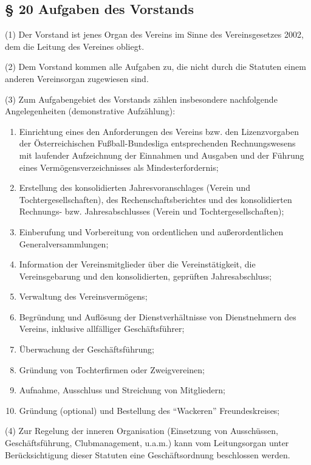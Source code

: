 \documentclass[11pt,a4paper]{article}
\begin{document}
\subsection{§ 20
Aufgaben des Vorstands}

(1)
Der Vorstand ist jenes Organ des Vereins im Sinne des Vereinsgesetzes 2002, dem die Leitung des Vereines obliegt.

(2)
Dem Vorstand kommen alle Aufgaben zu, die nicht durch die Statuten einem anderen Vereinsorgan zugewiesen sind.

(3)
Zum Aufgabengebiet des Vorstands zählen insbesondere nachfolgende Angelegenheiten (demonstrative Aufzählung):

\begin{enumerate}[label=\alph*)]
\item
Einrichtung eines den Anforderungen des Vereins bzw. den Lizenzvorgaben der Österreichischen Fußball-Bundesliga entsprechenden Rechnungswesens mit laufender Aufzeichnung der Einnahmen und Ausgaben und der Führung eines Vermögensverzeichnisses als Mindesterfordernis;
\item
Erstellung des konsolidierten Jahresvoranschlages (Verein und Tochtergesellschaften), des Rechenschaftsberichtes und des konsolidierten Rechnungs- bzw. Jahresabschlusses (Verein und Tochtergesellschaften);
\item
Einberufung und Vorbereitung von ordentlichen und außerordentlichen Generalversammlungen;
\item
Information der Vereinsmitglieder über die Vereinstätigkeit, die Vereinsgebarung und den konsolidierten, geprüften Jahresabschluss;
\item
Verwaltung des Vereinsvermögens;
\item
Begründung und Auflösung der Dienstverhältnisse von Dienstnehmern des Vereins, inklusive allfälliger Geschäftsführer;
\item
Überwachung der Geschäftsführung;
\item
Gründung von Tochterfirmen oder Zweigvereinen;
\item
Aufnahme, Ausschluss und Streichung von Mitgliedern;
\item
Gründung (optional) und Bestellung des "`Wackeren"' Freundeskreises;
\end{enumerate}

(4)
Zur Regelung der inneren Organisation (Einsetzung von Ausschüssen, Geschäftsführung, Clubmanagement, u.a.m.) kann vom Leitungsorgan unter Berücksichtigung dieser Statuten eine Geschäftsordnung beschlossen werden.
\end{document}
